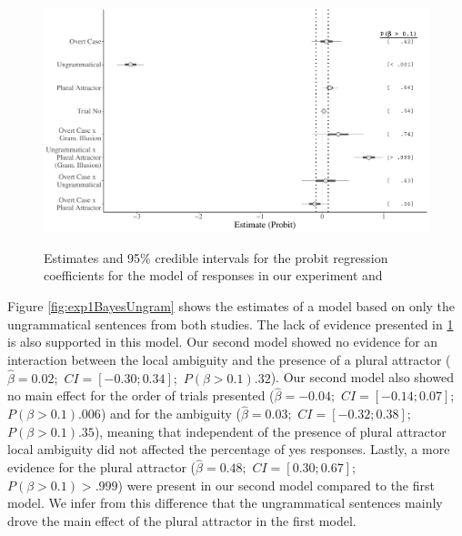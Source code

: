 \begin{figure}[hbt!]
{\centering \includegraphics[width=\linewidth]{figure/exp1BayesPool-1} 
}
\caption[Estimates and 95\% credible intervals for the probit regression coefficients for the model of responses in our experiment and Lago et al. (2019)]{Estimates and 95\% credible intervals for the probit regression coefficients for the model of responses in our experiment and \citet{LagoEtAl2019}}\label{fig:exp1BayesPool}

\end{figure}

Figure \ref{fig:exp1BayesUngram} shows the estimates of a model based on only the ungrammatical sentences from both studies. The lack of evidence presented in \ref{fig:exp1BayesPool} is also supported in this model. Our second model showed no evidence for an interaction between the local ambiguity and the presence of a plural attractor ($\hat{\beta}=0.02;$ $CI=[-0.30; 0.34];$ $P(\beta>0.1)   .32$). Our second model also showed no main effect for the order of trials presented ($\hat{\beta}=-0.04;$ $CI=[-0.14; 0.07];$ $P(\beta>0.1)  .006$) and for the ambiguity ($\hat{\beta}=0.03;$ $CI=[-0.32; 0.38];$ $P(\beta>0.1)   .35$), meaning that independent of the presence of plural attractor local ambiguity did not affected the percentage of yes responses. Lastly, a more evidence for the plural attractor ($\hat{\beta}=0.48;$ $CI=[0.30; 0.67];$ $P(\beta>0.1)> .999$) were present in our second model compared to the first model. We infer from this difference that the ungrammatical sentences mainly drove the main effect of the plural attractor in the first model.


